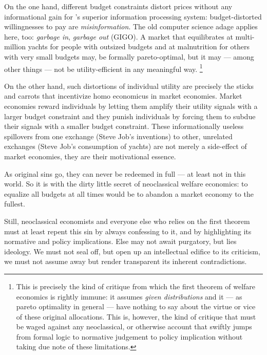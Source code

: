 On the one hand, different budget constraints distort prices without any informational gain for \citeauthor{Hayek1931}'s superior information processing system:
budget-distorted willingnesses to pay are \emph{misinformation}.
The old computer science adage applies here, too:
\emph{garbage in}, \emph{garbage out} (GIGO).
A market that equilibrates at multi-million yachts for people with outsized budgets and at malnutrition for others with very small budgets may, be formally pareto-optimal, but it may --- among other things --- not be utility-efficient in any meaningful way.
\footnote{
	This is precisely the kind of critique from which the first theorem of welfare economics is rightly immune:
	it assumes \emph{given distributions} and it --- as pareto optimality in general --- have nothing to say about the virtue or vice of these original allocations.
	This is, however, the kind of critique that must be waged against any neoclassical, or otherwise account that swiftly jumps from formal logic to normative judgement to policy implication without taking due note of these limitations.
}

On the other hand, such distortions of individual utility are precisely the sticks and carrots that incentivize homo economicus in market economies.
Market economies reward individuals by letting them amplify their utility signals with a larger budget constraint and they punish individuals by forcing them to subdue their signals with a smaller budget constraint.
These informationally useless spillovers from one exchange (Steve Job's inventions) to other, unrelated exchanges (Steve Job's consumption of yachts) are not merely a side-effect of market economies, they are their motivational essence.

As original sins go, they can never be redeemed in full --- at least not in this world.
So it is with the dirty little secret of neoclassical welfare economics:
to equalize all budgets at all times would be to abandon a market economy to the fullest.

Still, neoclassical economists and everyone else who relies on the first theorem must at least repent this sin by always confessing to it, and by highlighting its normative and policy implications.
Else may not await purgatory, but lies ideology.
We must not seal off, but open up an intellectual edifice to its criticism, we must not assume away but render transparent its inherent contradictions.

